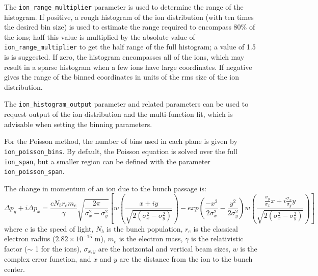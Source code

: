 The \verb|ion_range_multiplier| parameter is used to determine the range of the histogram.
If positive, a rough histogram of the ion distribution (with ten times the desired bin size) is used to
estimate the range required to encompass 80\% of the ions; half this value is multiplied
by the absolute value of \verb|ion_range_multiplier| to get the half range of the
full histogram; a value of 1.5 is is suggested.
If zero, the histogram encompasses all of the ions, which may result in a sparse histogram
when a few ions have large coordinates.
If negative gives the range of the binned coordinates in 
units of the rms size of the ion distribution.

The \verb|ion_histogram_output| parameter and related parameters can be used to 
request output of the ion distribution and the multi-function fit, which is advisable
when setting the binning parameters.

For the Poisson method, the number of bins used in each plane is given by \verb|ion_poisson_bins|.  By default, the Poisson equation is solved over the full \verb|ion_span|, but a smaller region can be defined with the parameter \verb|ion_poisson_span|.

The change in momentum of an ion due to the bunch passage is:
\begin{equation}
\Delta p_y + i \Delta p_x  = \frac{c N_b r_e m_e }{\gamma} \sqrt{\frac{2 \pi}{\sigma_x^2 - \sigma_y^2}} \left[ w\left(\frac{x + i y}{\sqrt{2 (\sigma_x^2 - \sigma_y^2)}}\right) 
   - exp\left(\frac{-x^2}{2 \sigma_x^2} - \frac{y^2}{2 \sigma_y^2}\right)  w\left(\frac{\frac{\sigma_y}{\sigma_x} x + i \frac{\sigma_x}{\sigma_y} y}{\sqrt{2 (\sigma_x^2 - \sigma_y^2)}}\right) \right]
\end{equation}
where $c$ is the speed of light, $N_b$ is the bunch population, $r_e$
is the classical electron radius ($2.82 \times 10^{-15}$ m), $m_e$ is
the electron mass, $\gamma$ is the relativistic factor ($\sim$ 1 for
the ions), $\sigma_{x,y}$ are the horizontal and vertical beam sizes,
$w$ is the complex error function, and $x$ and $y$ are the distance
from the ion to the bunch center.
